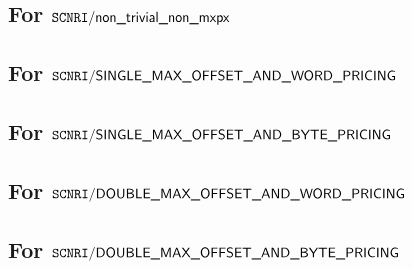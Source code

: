 \subsection{For $\texttt{SCNRI}\textsf{/}{\textsf{non\_trivial\_non\_mxpx}}$}                \label{mxp: computation: nontrivial_unexceptional}                                                                        
\subsection{For $\texttt{SCNRI}\textsf{/}{\textsf{SINGLE\_MAX\_OFFSET\_AND\_WORD\_PRICING}}$}       \label{mxp: computation: single_max_offset_word}              
\subsection{For $\texttt{SCNRI}\textsf{/}{\textsf{SINGLE\_MAX\_OFFSET\_AND\_BYTE\_PRICING}}$}       \label{mxp: computation: single_max_offset_byte}                          
\subsection{For $\texttt{SCNRI}\textsf{/}{\textsf{DOUBLE\_MAX\_OFFSET\_AND\_WORD\_PRICING}}$}       \label{mxp: computation: double_max_offset_word}              
\subsection{For $\texttt{SCNRI}\textsf{/}{\textsf{DOUBLE\_MAX\_OFFSET\_AND\_BYTE\_PRICING}}$}       \label{mxp: computation: double_max_offset_byte}              
